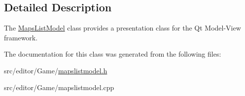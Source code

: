 \subsection{\-Detailed \-Description}
\-The \hyperlink{class_maps_list_model}{\-Maps\-List\-Model} class provides a presentation class for the \-Qt \-Model-\/\-View framework. 

\-The documentation for this class was generated from the following files\-:\begin{DoxyCompactItemize}
\item 
src/editor/\-Game/\hyperlink{mapslistmodel_8h}{mapslistmodel.\-h}\item 
src/editor/\-Game/mapslistmodel.\-cpp\end{DoxyCompactItemize}
